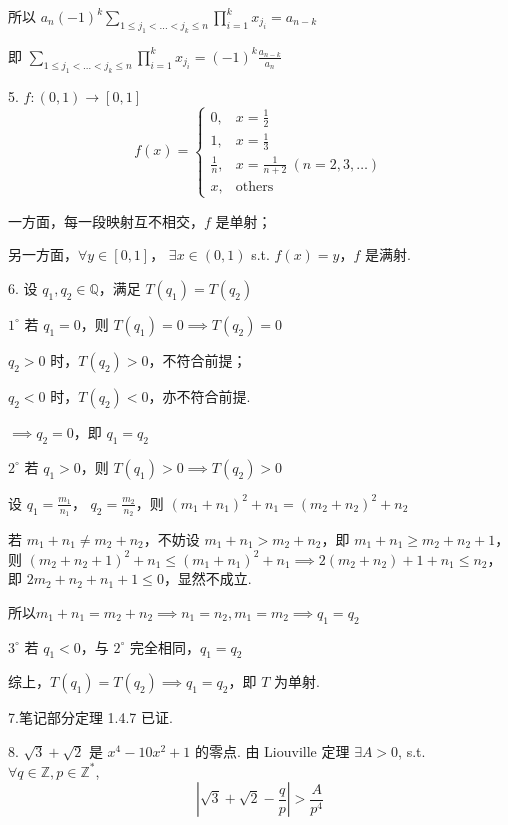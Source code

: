 所以 $a_n (-1)^k \sum_{1 \le j_1 < \dots < j_k \le n} \prod_{i=1}^k x_{j_i} = a_{n-k}$

即 $\sum_{1 \le j_1 < \dots < j_k \le n} \prod_{i=1}^k x_{j_i} = (-1)^k \frac{a_{n-k}}{a_n}$

\sepline

5.
$f: (0, 1) \to [0, 1]$
$$f(x) = \begin{cases}
0, & x = \frac{1}{2} \\
1, & x = \frac{1}{3} \\
\frac{1}{n}, & x = \frac{1}{n+2} \ (n=2,3,\dots) \\
x, & \text{others}
\end{cases}$$

一方面，每一段映射互不相交，$f$ 是单射；

另一方面，$\forall y \in [0, 1]$， $\exists x \in (0, 1)$ s.t. $f(x)=y$，$f$ 是满射.

\sepline

6.
设 $q_1, q_2 \in \mathbb{Q}$，满足 $T(q_1) = T(q_2)$

$1^\circ$ 若 $q_1 = 0$，则 $T(q_1) = 0 \implies T(q_2) = 0$

$q_2 > 0$ 时，$T(q_2) > 0$，不符合前提；

$q_2 < 0$ 时，$T(q_2) < 0$，亦不符合前提.

$\implies q_2 = 0$，即 $q_1 = q_2$

$2^\circ$ 若 $q_1 > 0$，则 $T(q_1) > 0 \implies T(q_2) > 0$

设 $q_1 = \frac{m_1}{n_1}$， $q_2 = \frac{m_2}{n_2}$，则 $(m_1+n_1)^2+n_1 = (m_2+n_2)^2+n_2$

若 $m_1+n_1 \neq m_2+n_2$，不妨设 $m_1+n_1 > m_2+n_2$，即 $m_1+n_1 \ge m_2+n_2+1$，则 $(m_2+n_2+1)^2+n_1 \le (m_1+n_1)^2+n_1$$\implies 2(m_2+n_2)+1+n_1 \le n_2$，即 $2m_2+n_2+n_1+1 \le 0$，显然不成立.

所以$ m_1+n_1 = m_2+n_2 \implies n_1 = n_2, m_1 = m_2 \implies q_1 = q_2$

$3^\circ$ 若 $q_1 < 0$，与 $2^\circ$ 完全相同，$q_1 = q_2$

综上，$T(q_1) = T(q_2) \implies q_1 = q_2$，即 $T$ 为单射.

\sepline

7.笔记部分定理 1.4.7 已证.

\sepline

8.
$\sqrt{3}+\sqrt{2}$ 是 $x^4-10x^2+1$ 的零点. 由 Liouville 定理 $\exists A > 0$, s.t. $\forall q \in \mathbb{Z}, p \in \mathbb{Z}^*$,
$$\left| \sqrt{3}+\sqrt{2} - \frac{q}{p} \right| > \frac{A}{p^4}$$

